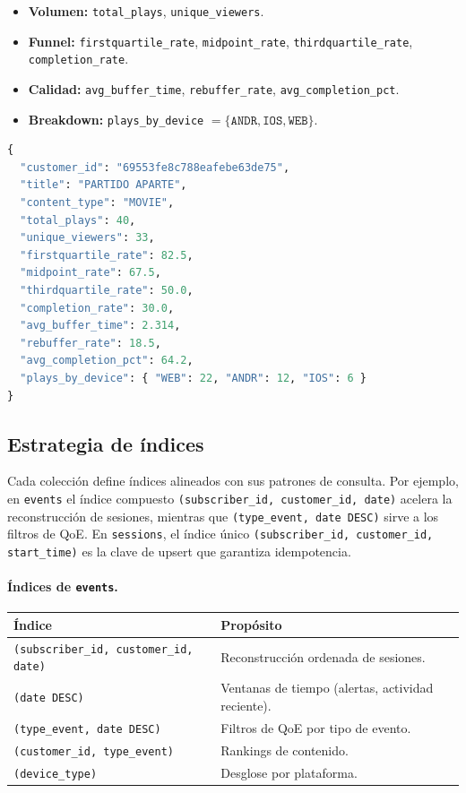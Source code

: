 \documentclass[12pt, letterpaper]{article}
\newcommand{\code}[1]{\texttt{#1}}
\begin{document}
\begin{itemize}[leftmargin=*]
  \item \textbf{Volumen:} \code{total\_plays}, \code{unique\_viewers}.
  \item \textbf{Funnel:} \code{firstquartile\_rate}, \code{midpoint\_rate},
        \code{thirdquartile\_rate}, \code{completion\_rate}.
  \item \textbf{Calidad:} \code{avg\_buffer\_time}, \code{rebuffer\_rate},
        \code{avg\_completion\_pct}.
  \item \textbf{Breakdown:} \code{plays\_by\_device} $=
        \{\code{ANDR}, \code{IOS}, \code{WEB}\}$.
\end{itemize}

\begin{lstlisting}[language=Python,caption={Documento de ejemplo en \code{content\_stats}}]
{
  "customer_id": "69553fe8c788eafebe63de75",
  "title": "PARTIDO APARTE",
  "content_type": "MOVIE",
  "total_plays": 40,
  "unique_viewers": 33,
  "firstquartile_rate": 82.5,
  "midpoint_rate": 67.5,
  "thirdquartile_rate": 50.0,
  "completion_rate": 30.0,
  "avg_buffer_time": 2.314,
  "rebuffer_rate": 18.5,
  "avg_completion_pct": 64.2,
  "plays_by_device": { "WEB": 22, "ANDR": 12, "IOS": 6 }
}
\end{lstlisting}

\subsection{Estrategia de índices}
Cada colección define índices alineados con sus patrones de consulta. Por
ejemplo, en \code{events} el índice compuesto
\code{(subscriber\_id, customer\_id, date)} acelera la reconstrucción de
sesiones, mientras que \code{(type\_event, date DESC)} sirve a los filtros de
QoE. En \code{sessions}, el índice único
\code{(subscriber\_id, customer\_id, start\_time)} es la clave de upsert que
garantiza idempotencia.

\paragraph{Índices de \code{events}.}
\begin{center}
\begin{tabular}{@{}lL{7.5cm}@{}}
\toprule
\textbf{Índice} & \textbf{Propósito} \\
\midrule
\code{(subscriber\_id, customer\_id, date)} & Reconstrucción ordenada de sesiones. \\
\code{(date DESC)} & Ventanas de tiempo (alertas, actividad reciente). \\
\code{(type\_event, date DESC)} & Filtros de QoE por tipo de evento. \\
\code{(customer\_id, type\_event)} & Rankings de contenido. \\
\code{(device\_type)} & Desglose por plataforma. \\
\bottomrule
\end{tabular}
\end{center}
\end{document}
